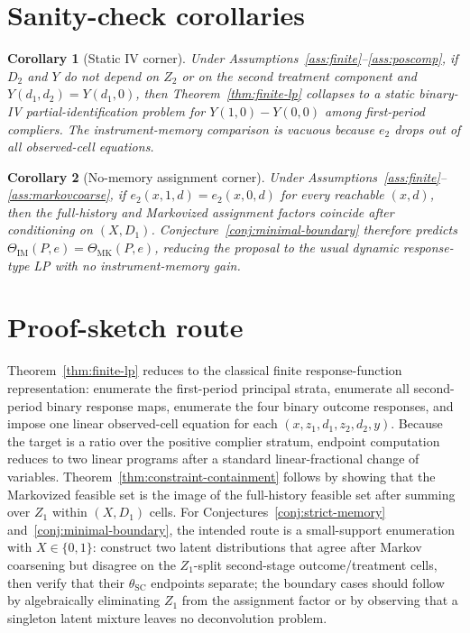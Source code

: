 \documentclass[11pt]{article}
\theoremstyle{definition}
\theoremstyle{plain}
\newtheorem{corollary}{Corollary}
\theoremstyle{remark}
\begin{document}
\section{Sanity-check corollaries}
\begin{corollary}[Static IV corner]\label{cor:static}
Under Assumptions~\ref{ass:finite}--\ref{ass:poscomp}, if \(D_2\) and \(Y\) do not depend on \(Z_2\) or on the second treatment component and \(Y(d_1,d_2)=Y(d_1,0)\), then Theorem~\ref{thm:finite-lp} collapses to a static binary-IV partial-identification problem for \(Y(1,0)-Y(0,0)\) among first-period compliers.  The instrument-memory comparison is vacuous because \(e_2\) drops out of all observed-cell equations.
\end{corollary}

\begin{corollary}[No-memory assignment corner]\label{cor:no-memory}
Under Assumptions~\ref{ass:finite}--\ref{ass:markovcoarse}, if \(e_2(x,1,d)=e_2(x,0,d)\) for every reachable \((x,d)\), then the full-history and Markovized assignment factors coincide after conditioning on \((X,D_1)\).  Conjecture~\ref{conj:minimal-boundary} therefore predicts \(\Theta_{\mathrm{IM}}(P,e)=\Theta_{\mathrm{MK}}(P,e)\), reducing the proposal to the usual dynamic response-type LP with no instrument-memory gain.
\end{corollary}

\section{Proof-sketch route}
Theorem~\ref{thm:finite-lp} reduces to the classical finite response-function representation: enumerate the first-period principal strata, enumerate all second-period binary response maps, enumerate the four binary outcome responses, and impose one linear observed-cell equation for each \((x,z_1,d_1,z_2,d_2,y)\).  Because the target is a ratio over the positive complier stratum, endpoint computation reduces to two linear programs after a standard linear-fractional change of variables.  Theorem~\ref{thm:constraint-containment} follows by showing that the Markovized feasible set is the image of the full-history feasible set after summing over \(Z_1\) within \((X,D_1)\) cells.  For Conjectures~\ref{conj:strict-memory} and~\ref{conj:minimal-boundary}, the intended route is a small-support enumeration with \(X\in\{0,1\}\): construct two latent distributions that agree after Markov coarsening but disagree on the \(Z_1\)-split second-stage outcome/treatment cells, then verify that their \(\theta_{\mathrm{SC}}\) endpoints separate; the boundary cases should follow by algebraically eliminating \(Z_1\) from the assignment factor or by observing that a singleton latent mixture leaves no deconvolution problem.
\end{document}

